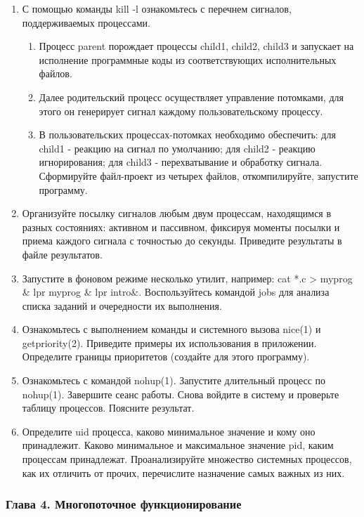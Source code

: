 \documentclass[14pt,a4paper,report]{report}
\begin{document}
\begin{enumerate}
	\item С помощью команды kill -l ознакомьтесь с перечнем сигналов, поддерживаемых процессами.
	\begin{enumerate}
		\item Процесс parent порождает процессы child1, child2, child3 и запускает на исполнение программные коды из соответствующих исполнительных файлов.
		\item Далее родительский процесс осуществляет управление потомками, для этого он генерирует сигнал каждому пользовательскому процессу.
		\item В пользовательских процессах-потомках необходимо обеспечить: для child1 - реакцию на сигнал по умолчанию; для child2 - реакцию игнорирования; для child3 - перехватывание и обработку сигнала. Сформируйте файл-проект из четырех файлов, откомпилируйте, запустите программу.
	\end{enumerate}
	\item Организуйте посылку сигналов любым двум процессам, находящимся в разных состояниях: активном и пассивном, фиксируя моменты посылки и приема каждого сигнала с точностью до секунды. Приведите результаты в файле результатов.
	\item Запустите в фоновом режиме несколько утилит, например: cat *.c > myprog \& lpr myprog \& lpr intro\&. Воспользуйтесь командой jobs для анализа списка заданий и очередности их выполнения.
	\item Ознакомьтесь с выполнением команды и системного вызова nice(1) и getpriority(2). Приведите примеры их использования в приложении. Определите границы приоритетов (создайте для этого программу).
	\item Ознакомьтесь с командой nohup(1). Запустите длительный процесс по nohup(1). Завершите сеанс работы. Снова войдите в систему и проверьте таблицу процессов. Поясните результат.
	\item Определите uid процесса, каково минимальное значение и кому оно принадлежит. Каково минимальное и максимальное значение pid, каким процессам принадлежат. Проанализируйте множество системных процессов, как их отличить от прочих, перечислите назначение самых важных из них.
\end{enumerate}

\subsubsection{Глава 4. Многопоточное функционирование}
\end{document}
